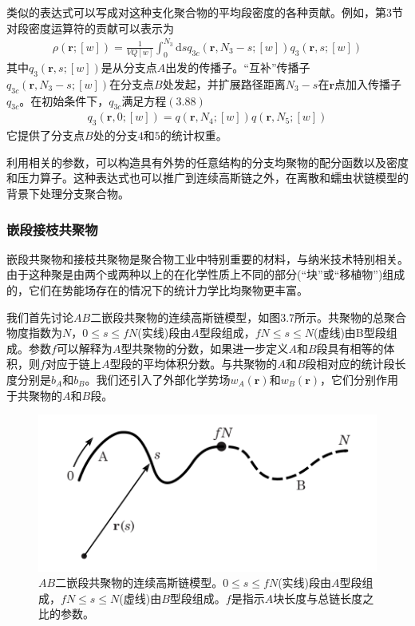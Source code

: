 类似的表达式可以写成对这种支化聚合物的平均段密度的各种贡献。例如，第$3$节对段密度运算符的贡献可以表示为
\begin{gather}
\rho(\mathbf{r};[w])=\frac{1}{VQ[w]}\int _{0}^{N_3} \mathrm{d}sq_{3c}(\mathbf{r},N_3-s;[w])q_3(\mathbf{r},s;[w])
\end{gather}
其中$q_3(\mathbf{r},s;[w])$是从分支点$A$出发的传播子。“互补”传播子$q_{3c}(\mathbf{r},N_3-s;[w])$在分支点$B$处发起，并扩展路径距离$N_3-s$在$\mathbf{r}$点加入传播子$q_{3c}$。在初始条件下，$q_{3c}$满足方程$(3.88)$
\begin{gather}
q_3(\mathbf{r},0;[w])=q(\mathbf{r},N_4;[w])q(\mathbf{r},N_5;[w])
\end{gather}
它提供了分支点$B$处的分支$4$和$5$的统计权重。

利用相关的参数，可以构造具有外势的任意结构的分支均聚物的配分函数以及密度和压力算子。这种表达式也可以推广到连续高斯链之外，在离散和蠕虫状链模型的背景下处理分支聚合物。

\subsubsection{嵌段接枝共聚物}
嵌段共聚物和接枝共聚物是聚合物工业中特别重要的材料，与纳米技术特别相关。由于这种聚是由两个或两种以上的在化学性质上不同的部分(“块”或“移植物”)组成的，它们在势能场存在的情况下的统计力学比均聚物更丰富。

我们首先讨论$AB$二嵌段共聚物的连续高斯链模型，如图$3.7$所示。共聚物的总聚合物度指数为$N$，$0\leq s \leq fN$(实线)段由$A$型段组成，$fN \leq s \leq N$(虚线)由B型段组成。参数$f$可以解释为$A$型共聚物的分数，如果进一步定义$A$和$B$段具有相等的体积，则$f$对应于链上$A$型段的平均体积分数。与共聚物的$A$和$B$段相对应的统计段长度分别是$b_A$和$b_B$。我们还引入了外部化学势场$w_A(\mathbf{r})$和$w_B(\mathbf{r})$，它们分别作用于共聚物的$A$和$B$段。

\begin{figure}[H]
\centering
\includegraphics[scale=0.7]{./figures/37.png}
\caption{$AB$二嵌段共聚物的连续高斯链模型。$0\leq s \leq fN$(实线)段由$A$型段组成，$fN \leq s \leq N$(虚线)由$B$型段组成。$f$是指示$A$块长度与总链长度之比的参数。}
\end{figure}

